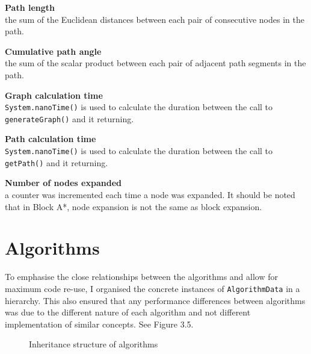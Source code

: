 \documentclass[12pt,notitlepage]{report}
\begin{document}
\begin{description}
\item {\bf Path length}\\ \hfill
the sum of the Euclidean distances between each pair of consecutive nodes in the path.
\item {\bf Cumulative path angle}\\ \hfill
the sum of the scalar product between each pair of adjacent path segments in the path.
\item {\bf Graph calculation time}\\ \hfill
{\tt System.nanoTime()} is used to calculate the duration between the call to {\tt generateGraph()} and it returning.
\item {\bf Path calculation time}\\ \hfill
{\tt System.nanoTime()} is used to calculate the duration between the call to {\tt getPath()} and it returning.
\item {\bf Number of nodes expanded}\\ \hfill
a counter was incremented each time a node was expanded. It should be noted that in Block A*, node expansion is not the same as block expansion.
\end{description}

\section{Algorithms}

To emphasise the close relationships between the algorithms and allow for maximum code re-use, I organised the concrete instances of {\tt AlgorithmData} in a hierarchy. This also ensured that any performance differences between algorithms was due to the different nature of each algorithm and not different implementation of similar concepts. See Figure 3.5.\\

\begin{figure}
\centering
{}
\caption{Inheritance structure of algorithms}
\end{figure}
\end{document}
